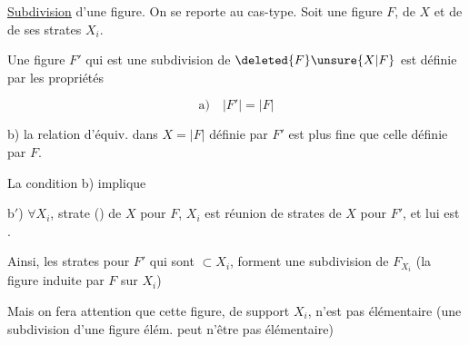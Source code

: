 \uline{Subdivision} d'une figure.  On se reporte au cas-type. Soit une figure $F$,  de $X$ et de  de ses strates $X_i$.

Une  figure $F'$ qui est une subdivision de $\deleted{F}\unsure{X|F}$ est  définie par les propriétés

\[
\text{a)}\quad |F'|=|F|
\]

b) la relation d'équiv. dans $X=|F|$ définie par $F'$ est plus fine que celle définie par  $F$.

La condition b) implique

b$'$) $\forall X_i$, strate () de $X$ pour $F$, $X_i$ est réunion de strates de $X$ pour $F'$,  et  lui est  .

Ainsi, les strates pour $F'$ qui sont $\subset X_i$, forment une  subdivision de $F_{X_i}$ (la figure  induite par $F$ sur $X_i$)

Mais on fera attention que cette figure, de support $X_i$, n'est pas  élémentaire (une subdivision d'une figure élém. peut n'être pas élémentaire)
